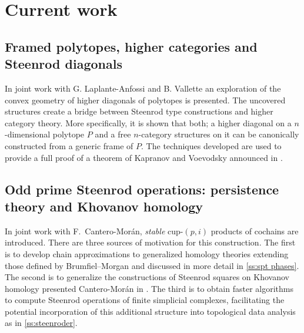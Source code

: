 \section{Current work} \label{s:current}

%

\subsection{Framed polytopes, higher categories and Steenrod diagonals} \label{ss:polytopes}

In joint work with G. Laplante-Anfossi and B. Vallette an exploration of the convex geometry of higher diagonals of polytopes is presented.
The uncovered structures create a bridge between Steenrod type constructions and higher category theory.
More specifically, it is shown that both; a higher diagonal on a $n$-dimensional polytope $P$ and a free $n$-category structures on it can be canonically constructed from a generic frame of $P$.
The techniques developed are used to provide a full proof of a theorem of Kapranov and Voevodsky announced in \cite{kapranov1991polycategories}.

\subsection{Odd prime Steenrod operations: persistence theory and Khovanov homology} \label{ss:odd prime steenrod operations}

In joint work with F.~Cantero-Mor\'an, \emph{stable} cup-$(p,i)$ products of cochains are introduced.
There are three sources of motivation for this construction.
The first is to develop chain approximations to generalized homology theories extending those defined by Brumfiel--Morgan and discussed in more detail in \cref{ss:spt phases}.
The second is to generalize the constructions of Steenrod squares on Khovanov homology presented Cantero-Mor\'an in \cite{cantero-moran2020khovanov}.
The third is to obtain faster algorithms to compute Steenrod operations of finite simplicial complexes, facilitating the potential incorporation of this additional structure into topological data analysis as in \cref{ss:steenroder}.

